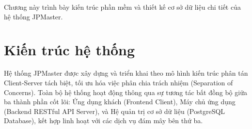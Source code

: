 \documentclass[../DoAn.tex]{subfiles}
\begin{document}
Chương này trình bày kiến trúc phần mềm và thiết kế cơ sở dữ liệu chi tiết của hệ thống JPMaster.

\section{Kiến trúc hệ thống}
\label{section:4.1}

Hệ thống JPMaster được xây dựng và triển khai theo mô hình kiến trúc phân tán Client-Server tách biệt, tối ưu hóa việc phân chia trách nhiệm (Separation of Concerns). Toàn bộ hệ thống hoạt động thông qua sự tương tác bất đồng bộ giữa ba thành phần cốt lõi: Ứng dụng khách (Frontend Client), Máy chủ ứng dụng (Backend RESTful API Server), và Hệ quản trị cơ sở dữ liệu (PostgreSQL Database), kết hợp linh hoạt với các dịch vụ đám mây bên thứ ba.
\end{document}
